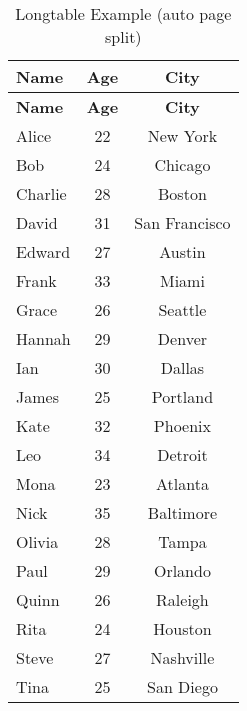 \documentclass[12pt,a4paper]{article}
\begin{document}
	\begin{longtable}{l c c}
		\caption{Longtable Example (auto page split)}\\
		\toprule
		\textbf{Name} & \textbf{Age} & \textbf{City} \\
		\midrule
		\endfirsthead
		\toprule
		\textbf{Name} & \textbf{Age} & \textbf{City} \\
		\midrule
		\endhead
		Alice & 22 & New York \\
		Bob & 24 & Chicago \\
		Charlie & 28 & Boston \\
		David & 31 & San Francisco \\
		Edward & 27 & Austin \\
		Frank & 33 & Miami \\
		Grace & 26 & Seattle \\
		Hannah & 29 & Denver \\
		Ian & 30 & Dallas \\
		James & 25 & Portland \\
		Kate & 32 & Phoenix \\
		Leo & 34 & Detroit \\
		Mona & 23 & Atlanta \\
		Nick & 35 & Baltimore \\
		Olivia & 28 & Tampa \\
		Paul & 29 & Orlando \\
		Quinn & 26 & Raleigh \\
		Rita & 24 & Houston \\
		Steve & 27 & Nashville \\
		Tina & 25 & San Diego \\
		\bottomrule
	\end{longtable}
	
\end{document}
